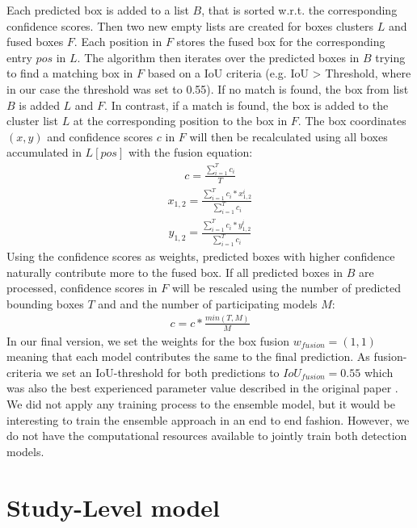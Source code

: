 Each predicted box is added to a list $B$, that is sorted w.r.t. the corresponding confidence scores. Then two new empty lists are created for boxes clusters $L$ and fused boxes $F$. Each position in $F$ stores the fused box for the corresponding entry $pos$ in $L$. The algorithm then iterates over the predicted boxes in $B$ trying to find a matching box in $F$ based on a \ac{IoU} criteria (e.g. IoU > Threshold, where in our case the threshold was set to 0.55). If no match is found, the box from list $B$ is added $L$ and $F$. In contrast, if a match is found, the box is added to the cluster list $L$ at the corresponding position to the box in $F$. The box coordinates $(x,y)$ and confidence scores $c$ in $F$ will then be recalculated using all boxes accumulated in $L[pos]$ with the fusion equation:
\begin{align}
	c = \frac{\sum_{i=1}^{T}c_i}{T}
\end{align}
\begin{align}
	x_{1,2} = \frac{\sum_{i=1}^{T} c_i * x_{1,2}^i}{\sum_{i=1}^{T} c_i}
\end{align}
\begin{align}
	y_{1,2} = \frac{\sum_{i=1}^{T} c_i * y_{1,2}^i}{\sum_{i=1}^{T} c_i}
\end{align}
Using the confidence scores as weights, predicted boxes with higher confidence naturally contribute more to the fused box.
If all predicted boxes in $B$ are processed, confidence scores in $F$ will be rescaled using the number of predicted bounding boxes $T$ and and the number of participating models $M$:
\begin{align}
	c = c * \frac{min(T,M)}{M}
\end{align}
In our final version, we set the weights for the box fusion $w_{fusion} = (1,1)$ meaning that each model contributes the same to the final prediction.
As fusion-criteria we set an \ac{IoU}-threshold for both predictions to $IoU_{fusion} = 0.55$ which was also the best experienced parameter value described in the original paper \autocite{weightedBoxFusion}.
We did not apply any training process to the ensemble model, but it would be interesting to train the ensemble approach in an end to end fashion. However, we do not have the computational resources available to jointly train both detection models.



\section{Study-Level model}

